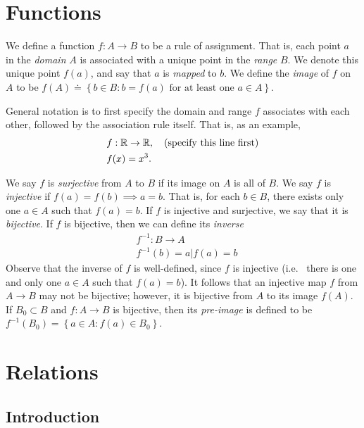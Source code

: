 \section{Functions}
We define a function $f: A \to B$ to be a rule of assignment. That is,
each point $a$ in the \emph{domain} $A$ is associated with a unique point in
the \emph{range} $B$. We denote this unique point $f(a)$, and say that
$a$ is \emph{mapped} to $b$. We define the \emph{image} of $f$ on $A$ to be
$f(A) \doteq \left\{ b \in B: b = f(a) \text{ for at least one } a \in A
\right\}$.
\begin{example}
	General notation is to first specify the domain and range $f$ associates with each
	other, followed by the association rule itself. That is, as an example,
	\begin{equation*}
		\begin{split}
			& f: \mathbb{R} \to \mathbb{R}, \quad \text{(specify this line first)}\\
			& f(x) = x^{3}.
		\end{split}
	\end{equation*}
\end{example}
We say $f$ is \emph{surjective} from $A$ to $B$ if its image on $A$ is all of
$B$. We say $f$ is \emph{injective} if $f(a) = f(b) \implies a = b$. That is,
for each $b \in B$, there exists only one $a \in A$ such that $f(a) = b$.
If $f$ is injective and surjective, we say that it is \emph{bijective}.
If $f$ is bijective, then we can define its \emph{inverse} 
\begin{equation*}
	\begin{split}
		& f^{-1}: B \to A
		\\
		& f^{-1}(b) = a | f(a) = b
	\end{split}
\end{equation*}
Observe that the inverse of $f$ is well-defined, since $f$ is injective (i.e. \
there is one and only one $a \in A$ such that $f(a) = b$). It follows that
an injective map $f$ from $A \to B$ may not be bijective; however, it is
bijective from $A$ to its image $f(A)$. If $B_{0} \subset B$ and $f: A \to B$ is
bijective, then its
\emph{pre-image} is defined to be $f^{-1}(B_{0}) = \left\{ a \in A: f(a) \in
B_{0} \right\}$.
\section{Relations}
\subsection{Introduction} 


